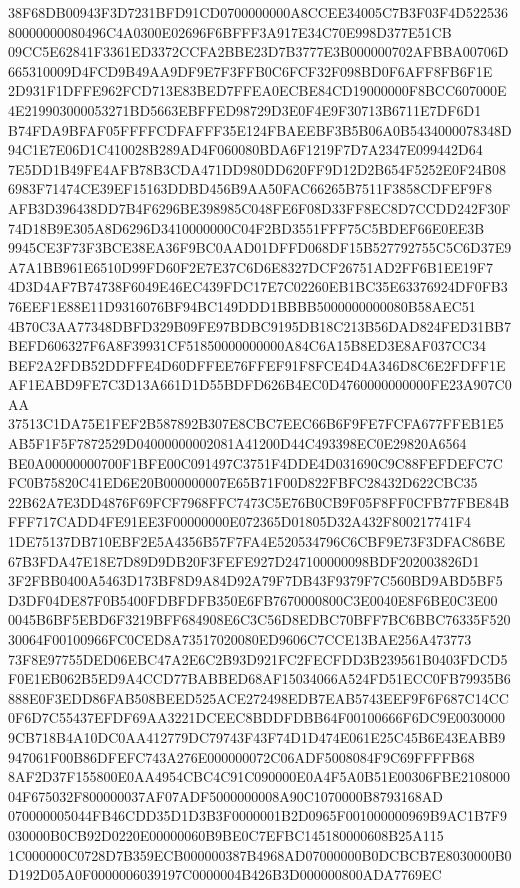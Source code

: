 \documentclass[UTF8,fontset=fandol,zihao=-4,a4paper]{ctexart}
\begin{document}
{{38F68DB00943F3D7231BFD91CD0700000000A8CCEE34005C7B3F03F4D52253680000000080496C4A0300E02696F6BFFF3A917E34C70E998D377E51CB
09CC5E62841F3361ED3372CCFA2BBE23D7B3777E3B000000702AFBBA00706D665310009D4FCD9B49AA9DF9E7F3FFB0C6FCF32F098BD0F6AFF8FB6F1E
2D931F1DFFE962FCD713E83BED7FFEA0ECBE84CD19000000F8BCC607000E4E219903000053271BD5663EBFFED98729D3E0F4E9F30713B6711E7DF6D1
B74FDA9BFAF05FFFFCDFAFFF35E124FBAEEBF3B5B06A0B5434000078348D94C1E7E06D1C410028B289AD4F060080BDA6F1219F7D7A2347E099442D64
7E5DD1B49FE4AFB78B3CDA471DD980DD620FF9D12D2B654F5252E0F24B086983F71474CE39EF15163DDBD456B9AA50FAC66265B7511F3858CDFEF9F8
AFB3D396438DD7B4F6296BE398985C048FE6F08D33FF8EC8D7CCDD242F30F74D18B9E305A8D6296D3410000000C04F2BD3551FFF75C5BDEF66E0EE3B
9945CE3F73F3BCE38EA36F9BC0AAD01DFFD068DF15B527792755C5C6D37E9A7A1BB961E6510D99FD60F2E7E37C6D6E8327DCF26751AD2FF6B1EE19F7
4D3D4AF7B74738F6049E46EC439FDC17E7C02260EB1BC35E63376924DF0FB376EEF1E88E11D9316076BF94BC149DDD1BBBB5000000000080B58AEC51
4B70C3AA77348DBFD329B09FE97BDBC9195DB18C213B56DAD824FED31BB7BEFD606327F6A8F39931CF51850000000000A84C6A15B8ED3E8AF037CC34
BEF2A2FDB52DDFFE4D60DFFEE76FFEF91F8FCE4D4A346D8C6E2FDFF1EAF1EABD9FE7C3D13A661D1D55BDFD626B4EC0D4760000000000FE23A907C0AA
37513C1DA75E1FEF2B587892B307E8CBC7EEC66B6F9FE7FCFA677FFEB1E5AB5F1F5F7872529D04000000002081A41200D44C493398EC0E29820A6564
BE0A00000000700F1BFE00C091497C3751F4DDE4D031690C9C88FEFDEFC7CFC0B75820C41ED6E20B000000007E65B71F00D822FBFC28432D622CBC35
22B62A7E3DD4876F69FCF7968FFC7473C5E76B0CB9F05F8FF0CFB77FBE84BFFF717CADD4FE91EE3F00000000E072365D01805D32A432F800217741F4
1DE75137DB710EBF2E5A4356B57F7FA4E520534796C6CBF9E73F3DFAC86BE67B3FDA47E18E7D89D9DB20F3FEFE927D247100000098BDF202003826D1
3F2FBB0400A5463D173BF8D9A84D92A79F7DB43F9379F7C560BD9ABD5BF5D3DF04DE87F0B5400FDBFDFB350E6FB7670000800C3E0040E8F6BE0C3E00
0045B6BF5EBD6F3219BFF684908E6C3C56D8EDBC70BFF7BC6BBC76335F52030064F00100966FC0CED8A73517020080ED9606C7CCE13BAE256A473773
73F8E97755DED06EBC47A2E6C2B93D921FC2FECFDD3B239561B0403FDCD5F0E1EB062B5ED9A4CCD77BABBED68AF15034066A524FD51ECC0FB79935B6
888E0F3EDD86FAB508BEED525ACE272498EDB7EAB5743EEF9F6F687C14CC0F6D7C55437EFDF69AA3221DCEEC8BDDFDBB64F00100666F6DC9E0030000
9CB718B4A10DC0AA412779DC79743F43F74D1D474E061E25C45B6E43EABB9947061F00B86DFEFC743A276E000000072C06ADF5008084F9C69FFFFB68
8AF2D37F155800E0AA4954CBC4C91C090000E0A4F5A0B51E00306FBE210800004F675032F800000037AF07ADF5000000008A90C1070000B8793168AD
070000005044FB46CDD35D1D3B3F0000001B2D0965F001000000969B9AC1B7F9030000B0CB92D0220E00000060B9BE0C7EFBC145180000608B25A115
1C000000C0728D7B359ECB000000387B4968AD07000000B0DCBCB7E8030000B0D192D05A0F0000006039197C0000004B426B3D000000800ADA7769EC
}}
\end{document}
